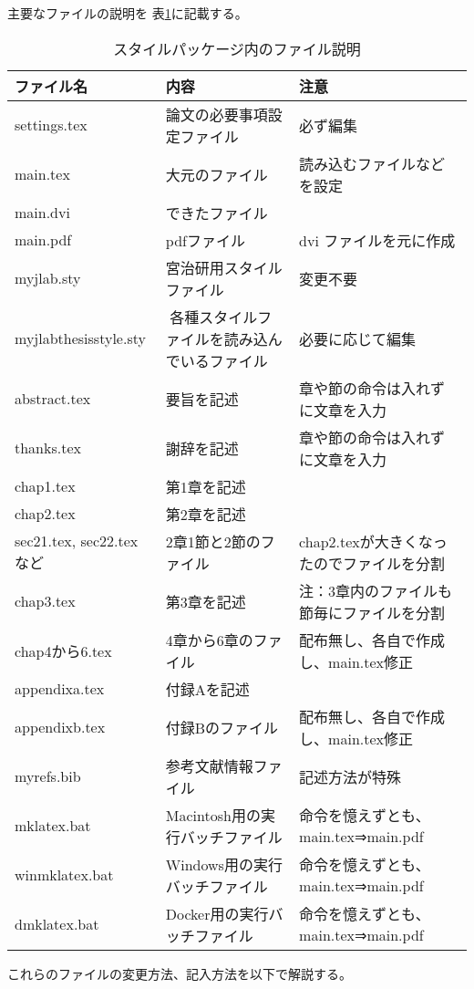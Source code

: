 主要なファイルの説明を 表\ref{table:files2}に記載する。
\begin{table}[H]
\begin{center}
\caption{スタイルパッケージ内のファイル説明}
\vspace{-2mm}
{\footnotesize
\begin{tabular}{|l|l|l|}
\hline
ファイル名 & 内容 & 注意\\\hline\hline
settings.tex & 論文の必要事項設定ファイル & 必ず編集\\\hline
main.tex & 大元のファイル & 読み込むファイルなどを設定\\\hline
main.dvi & できたファイル & \\\hline
main.pdf & pdfファイル & dvi ファイルを元に作成\\\hline
myjlab.sty & 宮治研用スタイルファイル & 変更不要\\\hline
myjlabthesisstyle.sty & 各種スタイルファイルを読み込んでいるファイル & 必要に応じて編集\\\hline
abstract.tex & 要旨を記述 & 章や節の命令は入れずに文章を入力\\\hline
thanks.tex & 謝辞を記述 & 章や節の命令は入れずに文章を入力\\\hline
chap1.tex & 第1章を記述 & \\\hline
chap2.tex & 第2章を記述 & \\\hline
sec21.tex, sec22.tex など& 2章1節と2節のファイル & chap2.texが大きくなったのでファイルを分割\\\hline
chap3.tex & 第3章を記述 & 注：3章内のファイルも節毎にファイルを分割\\\hline
chap4から6.tex & 4章から6章のファイル & 配布無し、各自で作成し、main.tex修正\\\hline
appendixa.tex & 付録Aを記述 & \\\hline
appendixb.tex & 付録Bのファイル & 配布無し、各自で作成し、main.tex修正\\\hline
myrefs.bib & 参考文献情報ファイル & 記述方法が特殊\\\hline
mklatex.bat & Macintosh用の実行バッチファイル & 命令を憶えずとも、main.tex⇒main.pdf\\\hline
winmklatex.bat & Windows用の実行バッチファイル & 命令を憶えずとも、
main.tex⇒main.pdf\\\hline
dmklatex.bat & Docker用の実行バッチファイル & 命令を憶えずとも、
main.tex⇒main.pdf\\\hline
\end{tabular}
}
\label{table:files2}
\end{center}
\end{table}

これらのファイルの変更方法、記入方法を以下で解説する。


